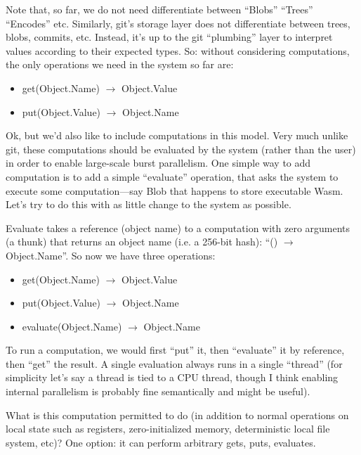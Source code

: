 \documentclass{article}
\newcommand{\bs}{\vspace{\baselineskip}}
\begin{document}
\bs

Note that, so far, we do not need differentiate between ``Blobs''
``Trees'' ``Encodes'' etc. Similarly, git's storage layer does not
differentiate between trees, blobs, commits, etc. Instead, it's up to
the git ``plumbing'' layer to interpret values according to their
expected types. So: without considering computations, the only
operations we need in the system so far are:

\begin{itemize}
\item    get(Object.Name) $\rightarrow$ Object.Value
\item    put(Object.Value) $\rightarrow$ Object.Name
\end{itemize}
    
Ok, but we'd also like to include computations in this model. Very
much unlike git, these computations should be evaluated by the system
(rather than the user) in order to enable large-scale burst
parallelism. One simple way to add computation is to add a simple
``evaluate'' operation, that asks the system to execute some
computation---say Blob that happens to store executable Wasm. Let's
try to do this with as little change to the system as possible.

\bs

Evaluate takes a reference (object name) to a computation with zero
arguments (a thunk) that returns an object name (i.e. a 256-bit hash):
``() $\rightarrow$ Object.Name''. So now we have three operations:

\begin{itemize}
\item    get(Object.Name) $\rightarrow$ Object.Value
\item    put(Object.Value) $\rightarrow$ Object.Name
\item    evaluate(Object.Name) $\rightarrow$ Object.Name
\end{itemize}
  
To run a computation, we would first ``put'' it, then ``evaluate'' it
by reference, then ``get'' the result. A single evaluation always runs
in a single ``thread'' (for simplicity let's say a thread is tied to a
CPU thread, though I think enabling internal parallelism is probably
fine semantically and might be useful).

\bs

What is this computation permitted to do (in addition to normal
operations on local state such as registers, zero-initialized memory,
deterministic local file system, etc)? One option: it can perform
arbitrary gets, puts, evaluates.
\end{document}
